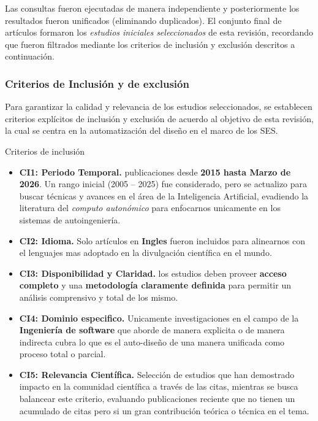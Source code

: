 \documentclass[12pt, letterpaper, oneside]{book}
\begin{document}
Las consultas fueron ejecutadas de manera independiente y posteriormente los resultados fueron unificados (eliminando duplicados). El conjunto final de artículos formaron los \textit{estudios iniciales seleccionados} de esta revisión, recordando que fueron filtrados mediante los criterios de inclusión y exclusión descritos a continuación.

\subsubsection{Criterios de Inclusión y de exclusión}

Para garantizar la calidad y relevancia de los estudios seleccionados, se establecen criterios explícitos de inclusión y exclusión de acuerdo al objetivo de esta revisión, la cual se centra en la automatización del diseño en el marco de los SES.

Criterios de inclusión

\begin{itemize}
	\item \textbf{CI1: Periodo Temporal.} publicaciones desde  \textbf{2015 hasta Marzo de 2026}. Un rango inicial (2005 -- 2025) fue considerado, pero se actualizo para buscar técnicas y avances en el área de la Inteligencia Artificial, evadiendo la literatura del \textit{computo autonómico} para enfocarnos unicamente en los sistemas de autoingeniería.
	\item \textbf{CI2: Idioma.} Solo artículos en \textbf{Ingles} fueron incluidos para alinearnos con el lenguajes mas adoptado en la divulgación científica en el mundo.
	\item \textbf{CI3: Disponibilidad y Claridad.} los estudios deben proveer \textbf{acceso completo} y una \textbf{metodología claramente definida} para permitir un análisis comprensivo y total de los mismo.
	\item \textbf{CI4: Dominio especifico.} Unicamente investigaciones en el campo de la \textbf{Ingeniería de software} que aborde de manera explicita o de manera indirecta cubra lo que es el auto-diseño de una manera unificada como proceso total o parcial.
	\item \textbf{CI5: Relevancia Científica.} Selección  de estudios que han demostrado impacto en la comunidad científica a través de las citas, mientras se busca balancear este criterio, evaluando publicaciones reciente que no tienen un acumulado de citas pero si un gran contribución teórica o técnica en el tema.
\end{itemize}
\end{document}
